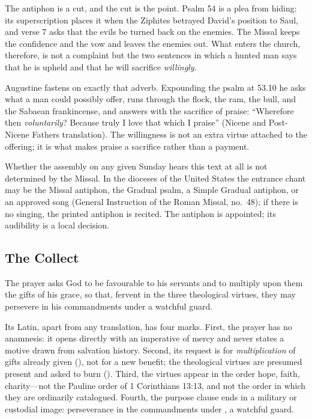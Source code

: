 The antiphon is a cut, and the cut is the point. Psalm 54 is a plea from
hiding: its superscription places it when the Ziphites betrayed David's
position to Saul, and verse 7 asks that the evils be turned back on the
enemies. The Missal keeps the confidence and the vow and leaves the enemies
out. What enters the church, therefore, is not a complaint but the two
sentences in which a hunted man says that he is upheld and that he will
sacrifice \emph{willingly}.

Augustine fastens on exactly that adverb. Expounding the psalm at
 53.10 he asks what a man could possibly offer,
runs through the flock, the ram, the bull, and the Sabaean frankincense, and
answers with the sacrifice of praise: ``Wherefore then \emph{voluntarily}?
Because truly I love that which I praise'' (Nicene and Post-Nicene Fathers
translation). The willingness is not an extra virtue attached to the offering;
it is what makes praise a sacrifice rather than a payment.

Whether the assembly on any given Sunday hears this text at all is not
determined by the Missal. In the dioceses of the United States the entrance
chant may be the Missal antiphon, the Gradual psalm, a Simple Gradual
antiphon, or an approved song (General Instruction of the Roman Missal, no.\
48); if there is no singing, the printed antiphon is recited. The antiphon is
appointed; its audibility is a local decision.

\subsection*{The Collect}

 The prayer asks God to be
favourable to his servants and to multiply upon them the gifts of his grace,
so that, fervent in the three theological virtues, they may persevere in his
commandments under a watchful guard.

Its Latin, apart from any translation, has four marks.
First, the prayer has no anamnesis: it opens directly with an
imperative of mercy and never states a motive drawn from salvation history.
Second, its request is for \emph{multiplication} of gifts already given
(\incipit{gratiae tuae \dots\ dona multiplica}), not for a new benefit; the
theological virtues are presumed present and asked to burn
(). Third, the virtues appear in the order hope, faith,
charity---not the Pauline order of 1 Corinthians 13:13, and not the order in
which they are ordinarily catalogued. Fourth, the purpose clause ends in a
military or custodial image: perseverance in the commandments under
\incipit{vigili custodia}, a watchful guard.

